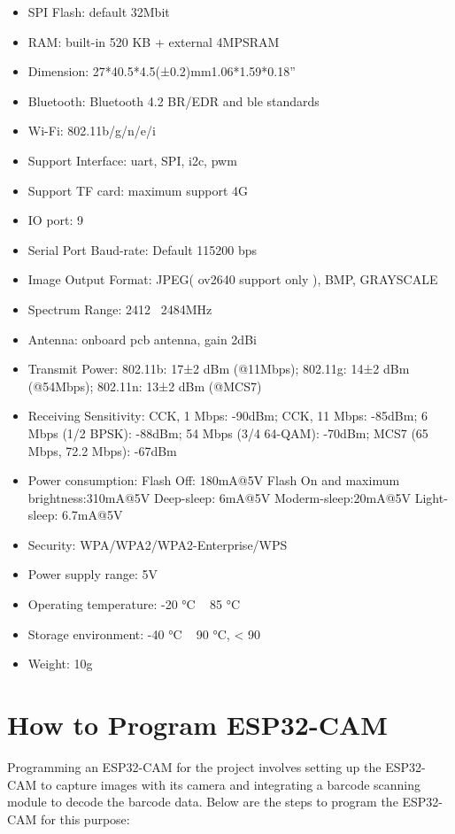 \begin{itemize}
    \item SPI Flash: default 32Mbit
    \item RAM: built-in 520 KB + external 4MPSRAM
    \item Dimension: 27*40.5*4.5(±0.2)mm1.06*1.59*0.18”
    \item Bluetooth: Bluetooth 4.2 BR/EDR and \ac{ble} standards
    \item Wi-Fi: 802.11b/g/n/e/i
    \item Support Interface: \ac{uart}, SPI, \ac{i2c}, \ac{pwm}
    \item Support TF card: maximum support 4G
    \item IO port: 9
    \item Serial Port Baud-rate: Default 115200 bps
    \item Image Output Format: JPEG( \ac{ov2640} support only ), BMP, GRAYSCALE
    \item Spectrum Range: 2412 ~2484MHz
    \item Antenna: onboard \ac{pcb} antenna, gain 2dBi
    \item Transmit Power: 802.11b: 17±2 dBm (@11Mbps);
    802.11g: 14±2 dBm (@54Mbps);                              802.11n: 13±2 dBm (@MCS7)
    \item Receiving Sensitivity: CCK, 1 Mbps: -90dBm;
    CCK, 11 Mbps: -85dBm; 
    6 Mbps (1/2 BPSK): -88dBm;
    54 Mbps (3/4 64-QAM): -70dBm;
    MCS7 (65 Mbps, 72.2 Mbps): -67dBm
    \item Power consumption: Flash Off: 180mA@5V
    Flash On and maximum brightness:310mA@5V             Deep-sleep: 6mA@5V                                    Moderm-sleep:20mA@5V                                  Light-sleep: 6.7mA@5V
    \item Security: WPA/WPA2/WPA2-Enterprise/WPS
    \item Power supply range: 5V
    \item Operating temperature: -20 °C ~ 85 °C
    \item Storage environment: -40 °C ~ 90 °C, < 90%
    \item Weight: 10g
\end{itemize}

\section{How to Program ESP32-CAM}

Programming an ESP32-CAM for the project involves setting up the ESP32-CAM to capture images with its camera and integrating a barcode scanning module to decode the barcode data. Below are the steps to program the ESP32-CAM for this purpose:

